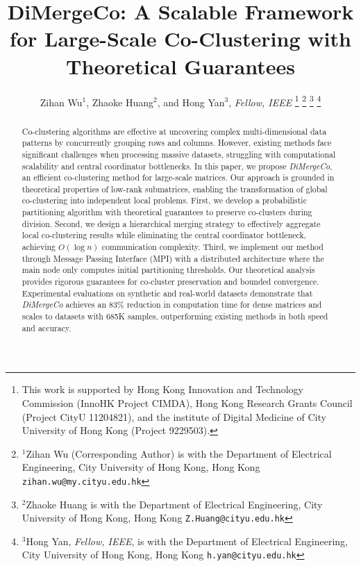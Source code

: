 \documentclass[journal]{IEEEtran}
\begin{document}
\title{\LARGE \bf DiMergeCo: A Scalable Framework for Large-Scale Co-Clustering with Theoretical Guarantees}


\author{Zihan Wu$^{1}$, Zhaoke Huang$^{2}$, and Hong Yan$^{3}$, \textit{Fellow, IEEE}%
    \thanks{This work is supported by Hong Kong Innovation and
        Technology Commission (InnoHK Project CIMDA), Hong
        Kong Research Grants Council (Project CityU 11204821), and the institute of Digital Medicine of City University of Hong Kong (Project 9229503). }%
    \thanks{$^{1}$Zihan Wu (Corresponding Author) is with the Department of Electrical Engineering,
        City University of Hong Kong, Hong Kong
            {\tt\small zihan.wu@my.cityu.edu.hk}}%
    \thanks{$^{2}$Zhaoke Huang is with the Department of Electrical Engineering,
        City University of Hong Kong, Hong Kong
            {\tt\small Z.Huang@cityu.edu.hk}}%
    \thanks{$^{3}$Hong Yan, \textit{Fellow, IEEE}, is with the Department of Electrical Engineering,
        City University of Hong Kong, Hong Kong
            {\tt\small h.yan@cityu.edu.hk}}%
}
\maketitle

\begin{abstract}
    Co-clustering algorithms are effective at uncovering complex multi-dimensional data patterns by concurrently grouping rows and columns. However, existing methods face significant challenges when processing massive datasets, struggling with computational scalability and central coordinator bottlenecks. In this paper, we propose \emph{DiMergeCo}, an efficient co-clustering method for large-scale matrices. Our approach is grounded in theoretical properties of low-rank submatrices, enabling the transformation of global co-clustering into independent local problems.  First, we develop a probabilistic partitioning algorithm with theoretical guarantees to preserve co-clusters during division. Second, we design a hierarchical merging strategy to effectively aggregate local co-clustering results while eliminating the central coordinator bottleneck, achieving $O(\log n)$ communication complexity. Third, we implement our method through Message Passing Interface (MPI) with a distributed architecture where the main node only computes initial partitioning thresholds.
    Our theoretical analysis provides rigorous guarantees for co-cluster preservation and bounded convergence. Experimental evaluations on synthetic and real-world datasets demonstrate that \emph{DiMergeCo} achieves an 83\% reduction in computation time for dense matrices and scales to datasets with 685K samples, outperforming existing methods in both speed and accuracy.
\end{abstract}
\end{document}
